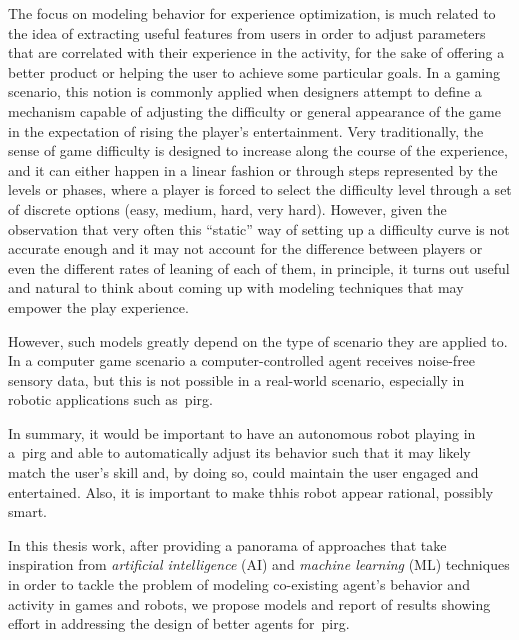 The focus on modeling behavior for experience optimization, is much related to the idea of extracting useful features from users in order to adjust parameters that are correlated with their experience in the activity, for the sake of offering a better product or helping the user to achieve some particular goals. In a gaming scenario, this notion is commonly applied when designers attempt to define a mechanism capable of adjusting the difficulty or general appearance of the game in the expectation of rising the player's entertainment. Very traditionally, the sense of game difficulty is designed to increase along the course of the experience, and it can either happen in a linear fashion or through steps represented by the levels or phases, where a player is forced to select the difficulty level through a set of discrete options (easy, medium, hard, very hard). However, given the observation that very often this ``static'' way of setting up a difficulty curve is not accurate enough and it may not account for the difference between players or even the different rates of leaning of each of them, in principle, it turns out useful and natural to think about coming up with modeling techniques that may empower the play experience. 

However, such models greatly depend on the type of scenario they are applied to. In a computer game scenario a computer-controlled agent receives noise-free sensory data, but this is not possible in a real-world scenario, especially in robotic applications such as~\gls{pirg}. 

In summary, it would be important to have an autonomous robot playing in a~\gls{pirg} and able to automatically adjust its behavior such that it may likely match the user's skill and, by doing so, could maintain the user engaged and entertained. Also, it is important to make thhis robot appear rational, possibly smart. 

In this thesis work, after providing a panorama of approaches that take inspiration from \textit{artificial intelligence} (AI) and \textit{machine learning} (ML) techniques in order to tackle the problem of modeling co-existing agent's behavior and activity in games and robots, we propose models and report of results showing effort in addressing the design of better agents for~\gls{pirg}.


